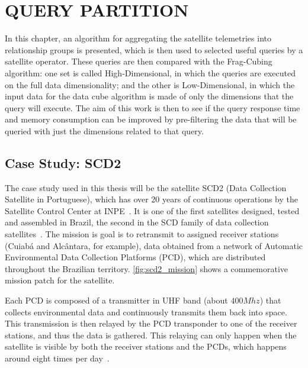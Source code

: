 
\chapter{QUERY PARTITION}\label{ch:querypart}

In this chapter, an algorithm for aggregating the satellite telemetries into relationship groups is presented, which is then used to selected useful queries by a satellite operator.
These queries are then compared with the Frag-Cubing algorithm: one set is called High-Dimensional, in which the queries are executed on the full data dimensionality; and the other is Low-Dimensional, in which the input data for the data cube algorithm is made of only the dimensions that the query will execute.
The aim of this work is then to see if the query response time and memory consumption can be improved by pre-filtering the data that will be queried with just the dimensions related to that query.

\section{Case Study: SCD2}\label{ch:querypart:scd2}

The case study used in this thesis will be the satellite SCD2 (Data Collection Satellite in Portuguese), which has over 20 years of continuous operations by the Satellite Control Center at INPE~\cite{OrlandoKuga:2007:SaSCSC}.
It is one of the first satellites designed, tested and assembled in Brazil, the second in the SCD family of data collection satellites~\cite{Oliveira:1996:SC1Sa}.
The mission is goal is to retransmit to assigned receiver stations (Cuiabá and Alcântara, for example), data obtained from a network of Automatic Environmental Data Collection Platforms (PCD), which are distributed throughout the Brazilian territory.
\autoref{fig:scd2_mission} shows a commemorative mission patch for the satellite.

Each PCD is composed of a transmitter in UHF band (about $400Mhz$) that collects environmental data and continuously transmits them back into space.
This transmission is then relayed by the PCD transponder to one of the receiver stations, and thus the data is gathered.
This relaying can only happen when the satellite is visible by both the receiver stations and the PCDs, which happens around eight times per day~\cite{miguezSCD2OperationHandbook1993}.

